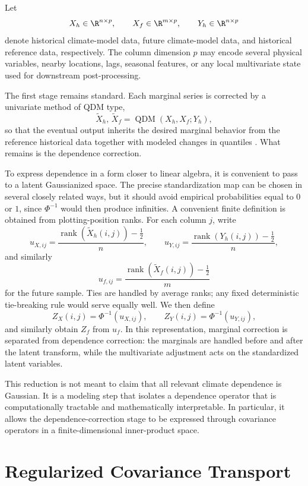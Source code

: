 Let
\[
	X_h \in \R^{n \times p}, \qquad X_f \in \R^{m \times p}, \qquad Y_h \in \R^{n \times p}
\]
denote historical climate-model data, future climate-model data, and historical reference data, respectively. The column dimension \(p\) may encode several physical variables, nearby locations, lags, seasonal features, or any local multivariate state used for downstream post-processing.

The first stage remains standard. Each marginal series is corrected by a univariate method of QDM type,
\[
	\widetilde X_h,\, \widetilde X_f = \operatorname{QDM}(X_h,X_f;Y_h),
\]
so that the eventual output inherits the desired marginal behavior from the reference historical data together with modeled changes in quantiles \cite{cannon2015qdm}. What remains is the dependence correction.

To express dependence in a form closer to linear algebra, it is convenient to pass to a latent Gaussianized space. The precise standardization map can be chosen in several closely related ways, but it should avoid empirical probabilities equal to \(0\) or \(1\), since \(\Phi^{-1}\) would then produce infinities. A convenient finite definition is obtained from plotting-position ranks. For each column \(j\), write
\[
	u_{X,ij} = \frac{\operatorname{rank}(\widetilde X_h(i,j)) - \tfrac12}{n},
	\qquad
	u_{Y,ij} = \frac{\operatorname{rank}(Y_h(i,j)) - \tfrac12}{n},
\]
and similarly
\[
	u_{f,ij} = \frac{\operatorname{rank}(\widetilde X_f(i,j)) - \tfrac12}{m}
\]
for the future sample. Ties are handled by average ranks; any fixed deterministic
tie-breaking rule would serve equally well. We then define
\[
	Z_X(i,j) = \Phi^{-1}(u_{X,ij}),
	\qquad
	Z_Y(i,j) = \Phi^{-1}(u_{Y,ij}),
\]
and similarly obtain \(Z_f\) from \(u_f\). In this representation, marginal correction is separated from dependence correction: the marginals are handled before and after the latent transform, while the multivariate adjustment acts on the standardized latent variables.

This reduction is not meant to claim that all relevant climate dependence is Gaussian. It is a modeling step that isolates a dependence operator that is computationally tractable and mathematically interpretable. In particular, it allows the dependence-correction stage to be expressed through covariance operators in a finite-dimensional inner-product space.

\section{Regularized Covariance Transport}

